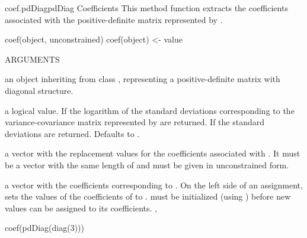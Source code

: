 \documentclass[pdftex]{article} \usepackage{url,graphicx}
\begin{document}
\begin{Helpfile}{coef.pdDiag}{pdDiag Coefficients}
This method function extracts the coefficients associated with the
positive-definite matrix represented by .
\begin{Example}
coef(object, unconstrained)
coef(object) <- value
\end{Example}
\begin{Argument}{ARGUMENTS}
\item[\Co{object:}]
an object inheriting from class ,
representing a positive-definite matrix with diagonal structure.
\item[\Co{unconstrained:}]
a logical value. If  the logarithm of
the standard deviations corresponding to the variance-covariance
matrix represented by  are returned. If  the
standard deviations are returned. Defaults to .
\item[\Co{value:}]
a vector with the replacement values for the coefficients
associated with . It must be a vector with the same length
of  and must be given in unconstrained form.
\end{Argument}
a vector with the coefficients corresponding to .
On the left side of an assignment, sets the values of the coefficients
of  to .  must be initialized (using
) before new values can be assigned to its
coefficients.
, 
\need 15pt
\vspace{-16pt} 
\begin{Example}
coef(pdDiag(diag(3)))
\end{Example}
\end{Helpfile}
\end{document}
